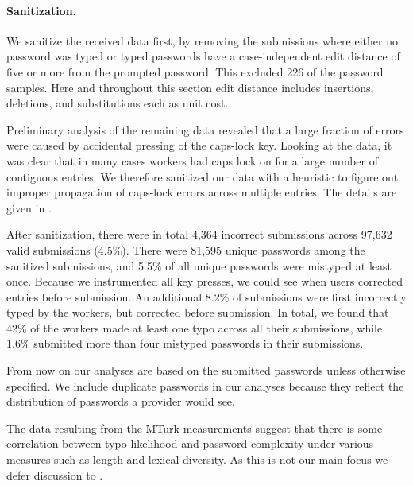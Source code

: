 \paragraph{Sanitization.} We sanitize the received data first, by removing
the submissions where either no password was typed or typed passwords have a
case-independent edit distance of five or more from the prompted password.
 This excluded 226 of the password samples.  Here and
throughout this section edit distance includes insertions, deletions, and
substitutions each as unit cost. 


Preliminary analysis of the remaining data revealed that a large
fraction of errors were caused by accidental pressing of the caps-lock
key. Looking at the data, it was clear that in many cases workers had caps lock
on for a large number of contiguous entries.  We therefore sanitized our data 
with a heuristic to figure out improper propagation of caps-lock errors across
multiple entries.
The details are given in .


After sanitization, there were in total 4,364 incorrect submissions
across 97,632 valid submissions (4.5\%).  There were 81,595 unique
passwords among the sanitized submissions, and 5.5\% of all unique
passwords were mistyped at least once.  Because we instrumented all
key presses, we could see when users corrected entries before
submission. An additional 8.2\% of submissions were first incorrectly
typed by the workers, but corrected before submission.  In total, we
found that 42\% of the workers made at least one typo across all their
submissions, while 1.6\% submitted more than four mistyped passwords
in their submissions.


From now on our analyses are based on the submitted passwords unless otherwise
specified. We include duplicate passwords in our analyses because they reflect
the distribution of passwords a provider would see.  


The data resulting from the MTurk measurements suggest that there is some correlation
between typo likelihood and password complexity under various measures such as length and lexical
diversity.  As this is not our main focus we defer discussion to
. 



